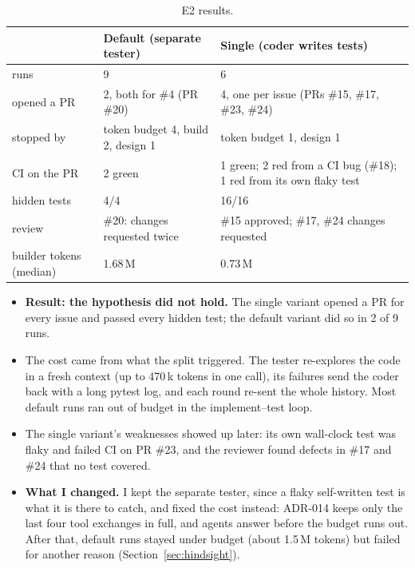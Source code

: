 \documentclass[11pt,a4paper]{article}
\begin{document}
\begin{table}[H]
\centering\small
\begin{tabularx}{\linewidth}{@{}l Y Y@{}}
\toprule
 & \textbf{Default (separate tester)} & \textbf{Single (coder writes tests)} \\
\midrule
runs & 9 & 6 \\
opened a PR & 2, both for \#4 (PR \#20) & 4, one per issue (PRs \#15, \#17, \#23, \#24) \\
stopped by & token budget 4, build 2, design 1 & token budget 1, design 1 \\
CI on the PR & 2 green & 1 green; 2 red from a CI bug (\#18); 1 red from its own flaky test \\
hidden tests & 4/4 & 16/16 \\
review & \#20: changes requested twice & \#15 approved; \#17, \#24 changes requested \\
builder tokens (median) & 1.68\,M & 0.73\,M \\
\bottomrule
\end{tabularx}
\caption{E2 results.}
\end{table}

\begin{itemize}
  \item \textbf{Result: the hypothesis did not hold.} The single variant opened a PR for every issue and
        passed every hidden test; the default variant did so in 2 of 9 runs.
  \item The cost came from what the split triggered. The tester re-explores the code in a fresh context (up
        to 470\,k tokens in one call), its failures send the coder back with a long pytest log, and each round
        re-sent the whole history. Most default runs ran out of budget in the implement--test loop.
  \item The single variant's weaknesses showed up later: its own wall-clock test was flaky and failed CI on
        PR \#23, and the reviewer found defects in \#17 and \#24 that no test covered.
  \item \textbf{What I changed.} I kept the separate tester, since a flaky self-written test is what it is
        there to catch, and fixed the cost instead: ADR-014 keeps only the last four tool exchanges in full,
        and agents answer before the budget runs out. After that, default runs stayed under budget (about
        1.5\,M tokens) but failed for another reason (Section~\ref{sec:hindsight}).
\end{itemize}
\end{document}
